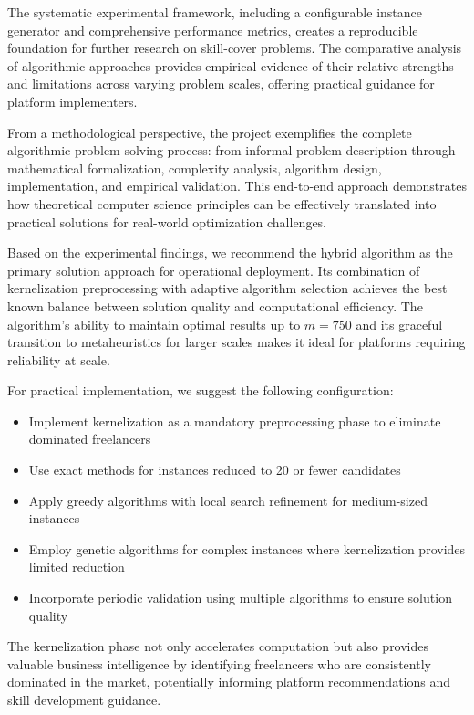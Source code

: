 \documentclass[12pt,a4paper]{article}
\begin{document}
The systematic experimental framework, including a configurable instance generator and comprehensive performance metrics, creates a reproducible foundation for further research on skill-cover problems. The comparative analysis of algorithmic approaches provides empirical evidence of their relative strengths and limitations across varying problem scales, offering practical guidance for platform implementers.

From a methodological perspective, the project exemplifies the complete algorithmic problem-solving process: from informal problem description through mathematical formalization, complexity analysis, algorithm design, implementation, and empirical validation. This end-to-end approach demonstrates how theoretical computer science principles can be effectively translated into practical solutions for real-world optimization challenges.

Based on the experimental findings, we recommend the hybrid algorithm as the primary solution approach for operational deployment. Its combination of kernelization preprocessing with adaptive algorithm selection achieves the best known balance between solution quality and computational efficiency. The algorithm's ability to maintain optimal results up to $m=750$ and its graceful transition to metaheuristics for larger scales makes it ideal for platforms requiring reliability at scale.

For practical implementation, we suggest the following configuration:
\begin{itemize}
	\item Implement kernelization as a mandatory preprocessing phase to eliminate dominated freelancers
	\item Use exact methods for instances reduced to 20 or fewer candidates
	\item Apply greedy algorithms with local search refinement for medium-sized instances
	\item Employ genetic algorithms for complex instances where kernelization provides limited reduction
	\item Incorporate periodic validation using multiple algorithms to ensure solution quality
\end{itemize}

The kernelization phase not only accelerates computation but also provides valuable business intelligence by identifying freelancers who are consistently dominated in the market, potentially informing platform recommendations and skill development guidance.
\end{document}
